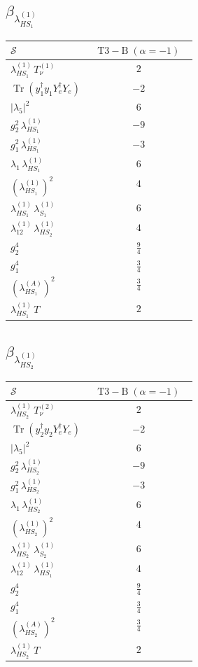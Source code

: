 \documentclass[9pt]{article}
\begin{document}
\subsection*{$ \beta_{\lambda_{HS_1}^{(1)}} $}
\begin{longtable}{@{}p{0.31\linewidth}c@{}}
\toprule
$\mathcal{S}$ & $ \mathrm{T3-B}\;(\alpha=-1) $ \\
\midrule
$ \lambda_{HS_1}^{(1)}\,T_{\nu}^{(1)} $ & $ 2 $ \\
$ \operatorname{Tr}(y_1^\dagger y_1Y_e^\dagger Y_e) $ & $ -2 $ \\
$ |\lambda_5|^2 $ & $ 6 $ \\
$ g_2^2\,\lambda_{HS_1}^{(1)} $ & $ -9 $ \\
$ g_1^2\,\lambda_{HS_1}^{(1)} $ & $ -3 $ \\
$ \lambda_1\,\lambda_{HS_1}^{(1)} $ & $ 6 $ \\
$ \left(\lambda_{HS_1}^{(1)}\right)^2 $ & $ 4 $ \\
$ \lambda_{HS_1}^{(1)}\,\lambda_{S_1}^{(1)} $ & $ 6 $ \\
$ \lambda_{12}^{(1)}\,\lambda_{HS_2}^{(1)} $ & $ 4 $ \\
$ g_2^4 $ & $ \frac{9}{4} $ \\
$ g_1^4 $ & $ \frac{3}{4} $ \\
$ \left(\lambda_{HS_1}^{(A)}\right)^2 $ & $ \frac{3}{4} $ \\
$ \lambda_{HS_1}^{(1)}\,T $ & $ 2 $ \\
\bottomrule
\end{longtable}
\subsection*{$ \beta_{\lambda_{HS_2}^{(1)}} $}
\begin{longtable}{@{}p{0.31\linewidth}c@{}}
\toprule
$\mathcal{S}$ & $ \mathrm{T3-B}\;(\alpha=-1) $ \\
\midrule
$ \lambda_{HS_2}^{(1)}\,T_{\nu}^{(2)} $ & $ 2 $ \\
$ \operatorname{Tr}(y_2^\dagger y_2Y_e^\dagger Y_e) $ & $ -2 $ \\
$ |\lambda_5|^2 $ & $ 6 $ \\
$ g_2^2\,\lambda_{HS_2}^{(1)} $ & $ -9 $ \\
$ g_1^2\,\lambda_{HS_2}^{(1)} $ & $ -3 $ \\
$ \lambda_1\,\lambda_{HS_2}^{(1)} $ & $ 6 $ \\
$ \left(\lambda_{HS_2}^{(1)}\right)^2 $ & $ 4 $ \\
$ \lambda_{HS_2}^{(1)}\,\lambda_{S_2}^{(1)} $ & $ 6 $ \\
$ \lambda_{12}^{(1)}\,\lambda_{HS_1}^{(1)} $ & $ 4 $ \\
$ g_2^4 $ & $ \frac{9}{4} $ \\
$ g_1^4 $ & $ \frac{3}{4} $ \\
$ \left(\lambda_{HS_2}^{(A)}\right)^2 $ & $ \frac{3}{4} $ \\
$ \lambda_{HS_2}^{(1)}\,T $ & $ 2 $ \\
\bottomrule
\end{longtable}
\end{document}
